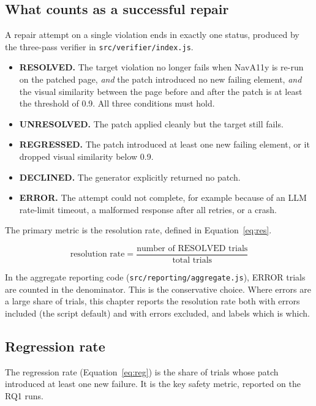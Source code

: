 \documentclass[11pt]{article}
\begin{document}
\subsection{What counts as a successful repair}

A repair attempt on a single violation ends in exactly one status, produced by the
three-pass verifier in \texttt{src/verifier/index.js}.

\begin{itemize}
  \item \textbf{RESOLVED.} The target violation no longer fails when NavA11y is
    re-run on the patched page, \emph{and} the patch introduced no new failing
    element, \emph{and} the visual similarity between the page before and after the
    patch is at least the threshold of 0.9. All three conditions must hold.
  \item \textbf{UNRESOLVED.} The patch applied cleanly but the target still fails.
  \item \textbf{REGRESSED.} The patch introduced at least one new failing element, or
    it dropped visual similarity below 0.9.
  \item \textbf{DECLINED.} The generator explicitly returned no patch.
  \item \textbf{ERROR.} The attempt could not complete, for example because of an LLM
    rate-limit timeout, a malformed response after all retries, or a crash.
\end{itemize}

The primary metric is the resolution rate, defined in Equation~\ref{eq:res}.

\begin{equation}
\label{eq:res}
\text{resolution rate} = \frac{\text{number of RESOLVED trials}}{\text{total trials}}
\end{equation}

In the aggregate reporting code (\texttt{src/reporting/aggregate.js}), ERROR trials
are counted in the denominator. This is the conservative choice. Where errors are a
large share of trials, this chapter reports the resolution rate both with errors
included (the script default) and with errors excluded, and labels which is which.

\subsection{Regression rate}

The regression rate (Equation~\ref{eq:reg}) is the share of trials whose patch
introduced at least one new failure. It is the key safety metric, reported on the RQ1
runs.
\end{document}
